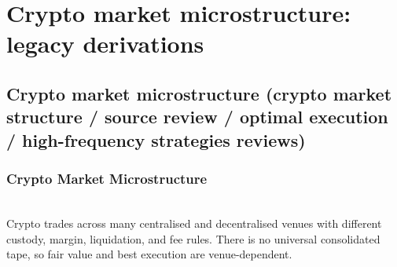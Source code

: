 \documentclass[a4paper,oneside,openany]{book}
\begin{document}
\chapter*{Crypto market microstructure: legacy derivations}

\section*{Crypto market microstructure (crypto market structure / source review / optimal execution / high-frequency strategies reviews)}

\subsection*{Crypto Market Microstructure}

\begin{principle} \\
Crypto trades across many centralised and decentralised venues with different custody, margin, liquidation, and fee rules. There is no universal consolidated tape, so fair value and best execution are venue-dependent.
\end{principle}
\end{document}

